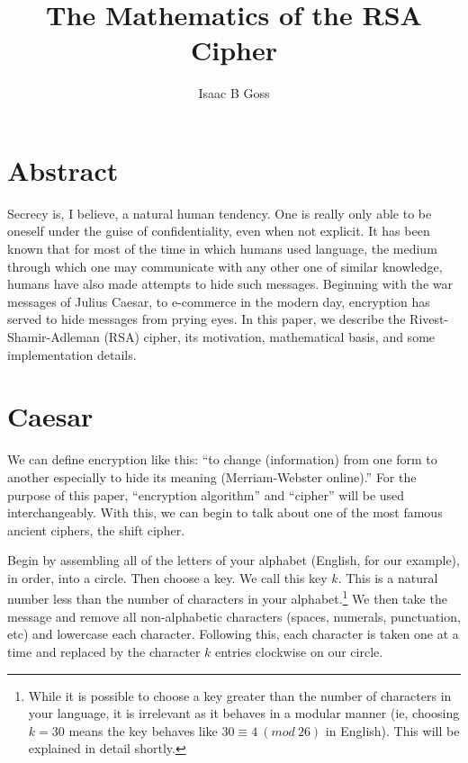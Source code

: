 \documentclass{article}
\begin{document}
\title{The Mathematics of the RSA Cipher}
\author{Isaac B Goss}
\maketitle

    \section{Abstract}
        Secrecy is, I believe, a natural human tendency.  One is really only able to be oneself under the guise of confidentiality, even when not explicit.  %
        It has been known that for most of the time in which humans used language, the medium through which one may communicate with any other one of similar knowledge, humans have also made attempts to hide such messages.
        Beginning with the war messages of Julius Caesar, to e-commerce in the modern day, encryption has served to hide messages from prying eyes.
        In this paper, we describe the Rivest-Shamir-Adleman (RSA) cipher, its motivation, mathematical basis, and some implementation details.
        
    \section{Caesar}
        We can define encryption like this: ``to change (information) from one form to another especially to hide its meaning (Merriam-Webster online).''  
        For the purpose of this paper, ``encryption algorithm'' and ``cipher'' will be used interchangeably.  
        With this, we can begin to talk about one of the most famous ancient ciphers, the shift cipher.  
        
        Begin by assembling all of the letters of your alphabet (English, for our example), in order, into a circle.  Then choose a key.  
        We call this key $k$.  
        This is a natural number less than the number of characters in your alphabet.\footnote{While it is possible to choose a key greater than the number of characters in your language, it is irrelevant as it behaves in a modular manner (ie, choosing $k=30$ means the key behaves like $30\equiv4\ (mod\ 26)$ in English). This will be explained in detail shortly.}
        We then take the message and remove all non-alphabetic characters (spaces, numerals, punctuation, etc) and lowercase each character.
        Following this, each character is taken one at a time and replaced by the character $k$ entries clockwise on our circle.
        
\end{document}
